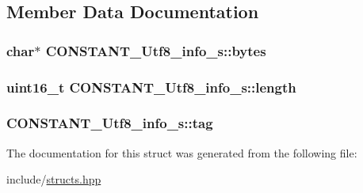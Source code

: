 \subsection{Member Data Documentation}
\hypertarget{structCONSTANT__Utf8__info__s_a773fbbd37e847eba505fa36f948f3bb5}{
\subsubsection[{bytes}]{\setlength{\rightskip}{0pt plus 5cm}char$\ast$ C\+O\+N\+S\+T\+A\+N\+T\+\_\+\+Utf8\+\_\+info\+\_\+s\+::bytes}}\label{structCONSTANT__Utf8__info__s_a773fbbd37e847eba505fa36f948f3bb5}
\hypertarget{structCONSTANT__Utf8__info__s_a9e45087cd112ac744db73614e4ffef05}{
\subsubsection[{length}]{\setlength{\rightskip}{0pt plus 5cm}uint16\+\_\+t C\+O\+N\+S\+T\+A\+N\+T\+\_\+\+Utf8\+\_\+info\+\_\+s\+::length}}\label{structCONSTANT__Utf8__info__s_a9e45087cd112ac744db73614e4ffef05}
\hypertarget{structCONSTANT__Utf8__info__s_a7af843af8dd80fb01a548d38aa7cf649}{
\subsubsection[{tag}]{ C\+O\+N\+S\+T\+A\+N\+T\+\_\+\+Utf8\+\_\+info\+\_\+s\+::tag}}\label{structCONSTANT__Utf8__info__s_a7af843af8dd80fb01a548d38aa7cf649}


The documentation for this struct was generated from the following file\+:\begin{DoxyCompactItemize}
\item 
include/\hyperlink{structs_8hpp}{structs.\+hpp}\end{DoxyCompactItemize}

